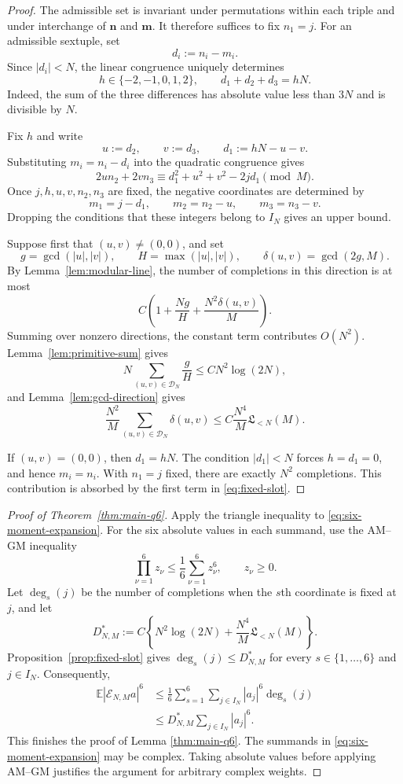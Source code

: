 \documentclass[11pt, twoside]{article}
\numberwithin{equation}{section}
\theoremstyle{definition}
\newcommand{\E}{\mathbb E}
\newcommand{\cE}{\mathcal E}
\newcommand{\Lcal}{\mathfrak L}
\begin{document}
\begin{proof}
The admissible set is invariant under permutations within each triple and
under interchange of $\bm n$ and $\bm m$.  It therefore suffices to fix
$n_1=j$.  For an admissible sextuple, set
$$
d_i:=n_i-m_i.
$$
Since $|d_i|<N$, the linear congruence uniquely determines
$$
h\in\{-2,-1,0,1,2\},
\qquad
d_1+d_2+d_3=hN.
$$
Indeed, the sum of the three differences has absolute value less than $3N$
and is divisible by $N$.

Fix $h$ and write
$$
u:=d_2,
\qquad
v:=d_3,
\qquad
d_1:=hN-u-v.
$$
Substituting $m_i=n_i-d_i$ into the quadratic congruence gives
$$
2un_2+2vn_3
\equiv d_1^2+u^2+v^2-2jd_1\pmod M.
$$
Once $j,h,u,v,n_2,n_3$ are fixed, the negative coordinates are determined by
$$
m_1=j-d_1,
\qquad
m_2=n_2-u,
\qquad
m_3=n_3-v.
$$
Dropping the conditions that these integers belong to $I_N$ gives an upper
bound.

Suppose first that $(u,v)\neq(0,0)$, and set
$$
g=\gcd(|u|,|v|),
\qquad
H=\max(|u|,|v|),
\qquad
\delta(u,v)=\gcd(2g,M).
$$
By Lemma~\ref{lem:modular-line}, the number of completions in this direction
is at most
$$
C\left(1+\frac{Ng}{H}+\frac{N^2\delta(u,v)}{M}\right).
$$
Summing over nonzero directions, the constant term contributes $O(N^2)$.
Lemma~\ref{lem:primitive-sum} gives
$$
N\sum_{(u,v)\in\mathcal D_N}\frac{g}{H}
\leq CN^2\log(2N),
$$
and Lemma~\ref{lem:gcd-direction} gives
$$
\frac{N^2}{M}
\sum_{(u,v)\in\mathcal D_N}\delta(u,v)
\leq C\frac{N^4}{M}\Lcal_{<N}(M).
$$

If $(u,v)=(0,0)$, then $d_1=hN$.  The condition $|d_1|<N$ forces
$h=d_1=0$, and hence $m_i=n_i$.  With $n_1=j$ fixed, there are exactly
$N^2$ completions.  This contribution is absorbed by the first term in
\eqref{eq:fixed-slot}.
\end{proof}

\begin{proof}[Proof of Theorem~\ref{thm:main-q6}]
Apply the triangle inequality to \eqref{eq:six-moment-expansion}.
For the six absolute values in each summand, use the AM--GM inequality
$$
\prod_{\nu=1}^{6}z_\nu
\leq\frac16\sum_{\nu=1}^{6}z_\nu^6,
\qquad z_\nu\geq0.
$$
Let $\deg_s(j)$ be the number of completions when the $s$th coordinate is
fixed at $j$, and let
$$
D^*_{N,M}:=
C\left\{N^2\log(2N)+\frac{N^4}{M}\Lcal_{<N}(M)\right\}.
$$
Proposition~\ref{prop:fixed-slot} gives
$\deg_s(j)\leq D^*_{N,M}$ for every $s\in\{1,\ldots,6\}$ and $j\in I_N$.
Consequently,
$$
\begin{aligned}
\E|\cE_{N,M}a|^6
&\leq\frac16\sum_{s=1}^{6}\sum_{j\in I_N}|a_j|^6\deg_s(j)\\
&\leq D^*_{N,M}\sum_{j\in I_N}|a_j|^6.
\end{aligned}
$$
This finishes the proof of Lemma \ref{thm:main-q6}.  The summands in
\eqref{eq:six-moment-expansion} may be complex.  Taking absolute values
before applying AM--GM justifies the argument for arbitrary complex weights.
\end{proof}
\end{document}
